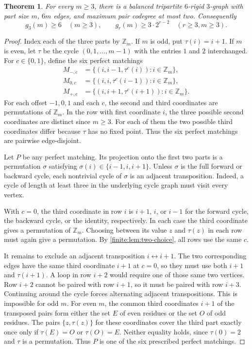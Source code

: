 \documentclass[10pt]{article}
\numberwithin{equation}{section}
\newtheorem{theorem}{Theorem}[section]
\begin{document}
\begin{theorem}\label{finite:thm:six}
For every $m\ge3$, there is a balanced tripartite $6$-rigid $3$-graph with part
size $m$, $6m$ edges, and maximum pair codegree at most two. Consequently
\[
 g_3(m)\ge6\quad(m\ge3),\qquad
 g_r(m)\ge3\cdot2^{r-2}\quad(r\ge3, m\ge3).
\]
\end{theorem}
\begin{proof}
Index each of the three parts by $\mathbb Z_m$. If $m$ is odd, put
$\tau(i)=i+1$. If $m$ is even, let $\tau$ be the cycle $(0,1,\ldots,m-1)$
with the entries $1$ and $2$ interchanged.
For $c\in\{0,1\}$, define the six perfect matchings
\begin{align*}
 M_{-,c}&=\{(i,i-1,\tau^c(i)):i\in\mathbb Z_m\},\\
 M_{0,c}&=\{(i,i,\tau^c(i-1)):i\in\mathbb Z_m\},\\
 M_{+,c}&=\{(i,i+1,\tau^c(i+1)):i\in\mathbb Z_m\}.
\end{align*}
For each offset $-1,0,1$ and each $c$, the second and third coordinates are permutations of $\mathbb Z_m$. In the row with first coordinate $i$, the three possible second coordinates are distinct since $m\ge3$. For each of them the two possible third coordinates differ because $\tau$ has no fixed point. Thus the six perfect matchings are pairwise edge-disjoint.

Let $P$ be any perfect matching. Its projection onto the first two parts
is a permutation $\sigma$ satisfying $\sigma(i)\in\{i-1,i,i+1\}$.
Unless $\sigma$ is the full forward or backward cycle, each nontrivial cycle of $\sigma$ is an adjacent transposition. Indeed, a cycle of length at least three in the underlying cycle graph must visit every vertex.

With $c=0$, the third coordinate in row $i$ is $i+1$, $i$, or $i-1$ for the forward cycle, the backward cycle, or the identity, respectively. In each case the third coordinate gives a permutation of $\mathbb Z_m$. Choosing between its value $z$ and $\tau(z)$ in each row must again give a permutation. By \cref{finite:lem:two-choice}, all rows use the same $c$.

It remains to exclude an adjacent transposition $i\leftrightarrow i+1$. The two corresponding edges have the same third coordinate $i+1$ at $c=0$, so they must use both $i+1$ and $\tau(i+1)$. A loop in row $i+2$ would require one of those same two vertices. Row $i+2$ cannot be paired with row $i+1$, so it must be paired with row $i+3$. Continuing around the cycle forces alternating adjacent transpositions. This is impossible for odd $m$. For even $m$, the common third coordinates $i+1$ of the transposed pairs form either the set $E$ of even residues or the set $O$ of odd residues. The pairs $\{z,\tau(z)\}$ for these coordinates cover the third part exactly once only if $\tau(E)=O$ or $\tau(O)=E$. Neither equality holds, since $\tau(0)=2$ and $\tau$ is a permutation. Thus $P$ is one of the six prescribed perfect matchings.


\end{proof}
\end{document}
